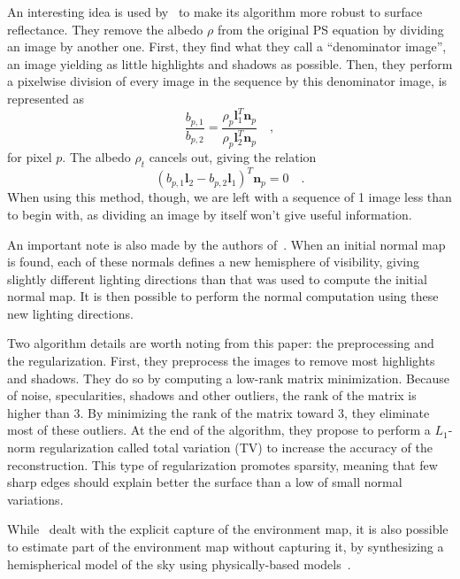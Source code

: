 An interesting idea is used by~\cite{yu-iccp-13} to make its algorithm more robust to surface reflectance. They remove the albedo $\rho$ from the original PS equation by dividing an image by another one. First, they find what they call a ``denominator image'', an image yielding as little highlights and shadows as possible. Then, they perform a pixelwise division of every image in the sequence by this denominator image, is represented as
\begin{equation}
\frac{b_{p,1}}{b_{p,2}} = \frac{\rho_p \mathbf{l}_1^T \mathbf{n}_p}{\rho_p \mathbf{l}_2^T \mathbf{n}_p} \quad,
\end{equation}
for pixel $p$. The albedo $\rho_t$ cancels out, giving the relation
\begin{equation}
\label{eq:ratio_images}
\left( b_{p,1} \mathbf{l}_2 - b_{p,2} \mathbf{l}_1 \right)^T \mathbf{n}_p = 0  \quad.
\end{equation}
When using this method, though, we are left with a sequence of 1 image less than to begin with, as dividing an image by itself won't give useful information.

An important note is also made by the authors of~\cite{yu-iccp-13}. When an initial normal map is found, each of these normals defines a new hemisphere of visibility, giving slightly different lighting directions than that was used to compute the initial normal map. It is then possible to perform the normal computation using these new lighting directions.

Two algorithm details are worth noting from this paper: the preprocessing and the regularization. First, they preprocess the images to remove most highlights and shadows. They do so by computing a low-rank matrix minimization. Because of noise, specularities, shadows and other outliers, the rank of the matrix is higher than 3. By minimizing the rank of the matrix toward 3, they eliminate most of these outliers. At the end of the algorithm, they propose to perform a $L_1$-norm regularization called total variation (TV) to increase the accuracy of the reconstruction. This type of regularization promotes sparsity, meaning that few sharp edges should explain better the surface than a low of small normal variations.

While~\cite{yu-iccp-13} dealt with the explicit capture of the environment map, it is also possible to estimate part of the environment map without capturing it, by synthesizing a hemispherical model of the sky using physically-based models~\cite{inose-tcva-13,jung-cvpr-15}.

